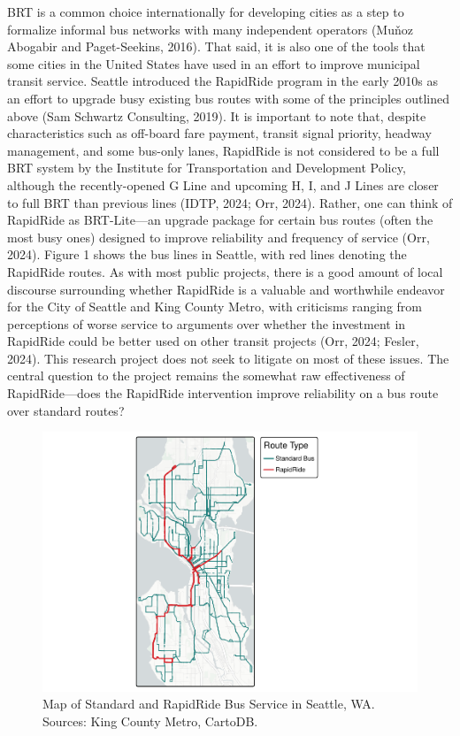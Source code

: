 \documentclass[
  12pt,
]{article}
\begin{document}
BRT is a common choice internationally for developing cities as a step
to formalize informal bus networks with many independent operators
(Muňoz Abogabir and Paget-Seekins, 2016). That said, it is also one of
the tools that some cities in the United States have used in an effort
to improve municipal transit service. Seattle introduced the RapidRide
program in the early 2010s as an effort to upgrade busy existing bus
routes with some of the principles outlined above (Sam Schwartz
Consulting, 2019). It is important to note that, despite characteristics
such as off-board fare payment, transit signal priority, headway
management, and some bus-only lanes, RapidRide is not considered to be a
full BRT system by the Institute for Transportation and Development
Policy, although the recently-opened G Line and upcoming H, I, and J
Lines are closer to full BRT than previous lines (IDTP, 2024; Orr,
2024). Rather, one can think of RapidRide as BRT-Lite---an upgrade
package for certain bus routes (often the most busy ones) designed to
improve reliability and frequency of service (Orr, 2024). Figure 1 shows
the bus lines in Seattle, with red lines denoting the RapidRide routes.
As with most public projects, there is a good amount of local discourse
surrounding whether RapidRide is a valuable and worthwhile endeavor for
the City of Seattle and King County Metro, with criticisms ranging from
perceptions of worse service to arguments over whether the investment in
RapidRide could be better used on other transit projects (Orr, 2024;
Fesler, 2024). This research project does not seek to litigate on most
of these issues. The central question to the project remains the
somewhat raw effectiveness of RapidRide---does the RapidRide
intervention improve reliability on a bus route over standard routes?

\begin{figure}
\centering
\includegraphics{thesis-draft-1_files/figure-latex/unnamed-chunk-7-1.pdf}
\caption{Map of Standard and RapidRide Bus Service in Seattle, WA.
Sources: King County Metro, CartoDB.}
\end{figure}
\end{document}
